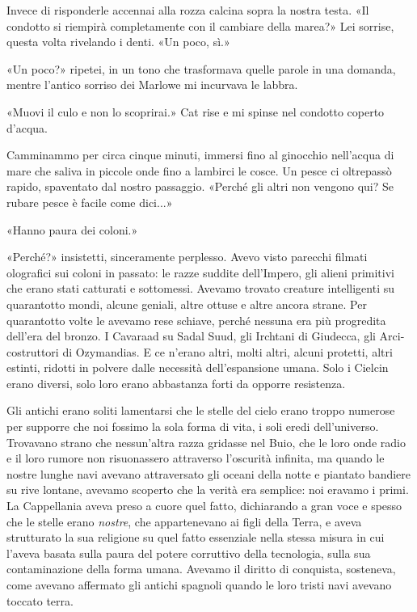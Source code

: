 Invece di risponderle accennai alla rozza calcina sopra la nostra testa.
«Il condotto si riempirà completamente con il cambiare della marea?» Lei
sorrise, questa volta rivelando i denti. «Un poco, sì.»

«Un poco?» ripetei, in un tono che trasformava quelle parole in una
domanda, mentre l'antico sorriso dei Marlowe mi incurvava le labbra.

«Muovi il culo e non lo scoprirai.» Cat rise e mi spinse nel condotto
coperto d'acqua.

Camminammo per circa cinque minuti, immersi fino al ginocchio nell'acqua
di mare che saliva in piccole onde fino a lambirci le cosce. Un pesce ci
oltrepassò rapido, spaventato dal nostro passaggio. «Perché gli altri
non vengono qui? Se rubare pesce è facile come dici...»

«Hanno paura dei coloni.»

«Perché?» insistetti, sinceramente perplesso. Avevo visto parecchi
filmati olografici sui coloni in passato: le razze suddite dell'Impero,
gli alieni primitivi che erano stati catturati e sottomessi. Avevamo
trovato creature intelligenti su quarantotto mondi, alcune geniali,
altre ottuse e altre ancora strane. Per quarantotto volte le avevamo
rese schiave, perché nessuna era più progredita dell'era del bronzo. I
Cavaraad su Sadal Suud, gli Irchtani di Giudecca, gli Arci-costruttori
di Ozymandias. E ce n'erano altri, molti altri, alcuni protetti, altri
estinti, ridotti in polvere dalle necessità dell'espansione umana. Solo
i Cielcin erano diversi, solo loro erano abbastanza forti da opporre
resistenza.

Gli antichi erano soliti lamentarsi che le stelle del cielo erano troppo
numerose per supporre che noi fossimo la sola forma di vita, i soli
eredi dell'universo. Trovavano strano che nessun'altra razza gridasse
nel Buio, che le loro onde radio e il loro rumore non risuonassero
attraverso l'oscurità infinita, ma quando le nostre lunghe navi avevano
attraversato gli oceani della notte e piantato bandiere su rive lontane,
avevamo scoperto che la verità era semplice: noi eravamo i primi. La
Cappellania aveva preso a cuore quel fatto, dichiarando a gran voce e
spesso che le stelle erano \emph{nostre}, che appartenevano ai figli
della Terra, e aveva strutturato la sua religione su quel fatto
essenziale nella stessa misura in cui l'aveva basata sulla paura del
potere corruttivo della tecnologia, sulla sua contaminazione della forma
umana. Avevamo il diritto di conquista, sosteneva, come avevano
affermato gli antichi spagnoli quando le loro tristi navi avevano
toccato terra.

